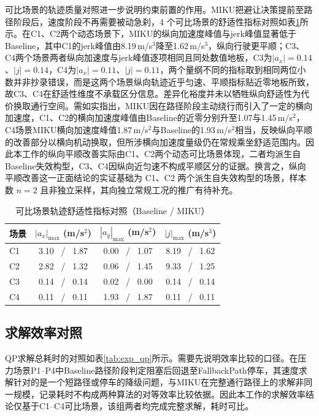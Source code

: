 \documentclass[a4paper,11pt]{ctexart}
\theoremstyle{definition}
\begin{document}
可比场景的轨迹质量对照进一步说明约束前置的作用。MIKU把避让决策提前至路径阶段后，速度阶段不再需要被动急刹，4 个可比场景的舒适性指标对照如表\ref{tab:exp_comfort}所示。在C1、C2两个动态场景下，MIKU的纵向加速度峰值与jerk峰值显著低于Baseline，其中C1的jerk峰值由8.19\,m/s$^3$降至1.62\,m/s$^3$，纵向行驶更平顺；C3、C4两个场景两者纵向加速度与jerk峰值逐项相同且同处数值地板，C3为$|a_x|=0.14$、$|j|=0.14$，C4为$|a_x|=0.11$、$|j|=0.11$，两个量纲不同的指标取到相同两位小数并非抄录错误，而是这两个场景纵向轨迹近乎匀速、平顺指标贴近零地板所致，故C3、C4在舒适性维度不承载区分信息。差异化裕度并未以牺牲纵向舒适性为代价换取通行空间。需如实指出，MIKU因在路径阶段主动绕行而引入了一定的横向加速度，C1、C2的横向加速度峰值由Baseline的近零分别升至1.07与1.45\,m/s$^2$，C4场景MIKU横向加速度峰值1.87\,m/s$^2$与Baseline的1.93\,m/s$^2$相当，反映纵向平顺的改善部分以横向机动换取，但所涉横向加速度量级仍在常规乘坐舒适范围内。因此本工作的纵向平顺改善实际由C1、C2两个动态可比场景体现，二者均派生自Baseline失效构型，C3、C4因纵向近匀速不构成平顺区分的证据。换言之，纵向平顺改善这一正面结论的实证基础为 C1、C2 两个派生自失效构型的场景，样本数 $n=2$ 且非独立采样，其向独立常规工况的推广有待补充。

\begin{table}[htbp]
\centering
\caption{可比场景轨迹舒适性指标对照（Baseline / MIKU）}
\label{tab:exp_comfort}
\small
\begin{tabular}{lccc}
\toprule
\textbf{场景} & \textbf{$|a_x|_{\max}$ (m/s$^2$)} & \textbf{$|a_y|_{\max}$ (m/s$^2$)} & \textbf{$|j|_{\max}$ (m/s$^3$)} \\
\midrule
C1 & 3.10 \ / \ 1.87 & 0.00 \ / \ 1.07 & 8.19 \ / \ 1.62 \\
C2 & 2.82 \ / \ 1.32 & 0.06 \ / \ 1.45 & 9.33 \ / \ 1.25 \\
C3 & 0.14 \ / \ 0.14 & 0.02 \ / \ 0.00 & 0.14 \ / \ 0.14 \\
C4 & 0.11 \ / \ 0.11 & 1.93 \ / \ 1.87 & 0.11 \ / \ 0.11 \\
\bottomrule
\end{tabular}
\end{table}

\subsection{求解效率对照}
\label{subsec:exp_qp}

QP求解总耗时的对照如表\ref{tab:exp_qp}所示。需要先说明效率比较的口径。在压力场景P1--P4中Baseline路径阶段判定阻塞后回退至FallbackPath停车，其速度求解针对的是一个短路径或停车的降级问题，与MIKU在完整通行路径上的求解非同一规模，记录耗时不构成两种算法的对等效率比较依据。因此本工作的求解效率结论仅基于C1--C4可比场景，该组两者均完成完整求解，耗时可比。
\end{document}

